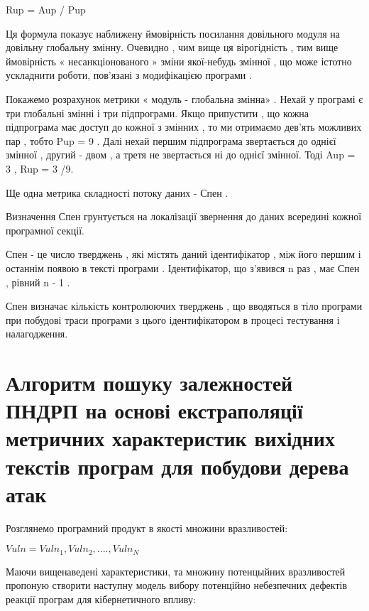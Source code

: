 Rup = Aup / Pup

Ця формула показує наближену ймовірність посилання довільного модуля на довільну глобальну змінну. Очевидно , чим вище ця вірогідність , тим вище ймовірність « несанкціонованого » зміни якої-небудь змінної , що може істотно ускладнити роботи, пов'язані з модифікацією програми .

Покажемо розрахунок метрики « модуль - глобальна змінна» . Нехай у програмі є три глобальні змінні і три підпрограми. Якщо припустити , що кожна підпрограма має доступ до кожної з змінних , то ми отримаємо дев'ять можливих пар , тобто Pup = 9 . Далі нехай першим підпрограма звертається до однієї змінної , другий - двом , а третя не звертається ні до однієї змінної. Тоді Aup = 3 , Rup = 3 /9.

Ще одна метрика складності потоку даних - Спен .

Визначення Спен грунтується на локалізації звернення до даних всередині кожної програмної секції.

Спен - це число тверджень , які містять даний ідентифікатор , між його першим і останнім появою в тексті програми . Ідентифікатор, що з'явився n раз , має Спен , рівний n - 1 .

Спен визначає кількість контролюючих тверджень , що вводяться в тіло програми при побудові траси програми з цього ідентифікатором в процесі тестування і налагодження.


\section{Алгоритм пошуку залежностей ПНДРП на основі екстраполяції метричних характеристик вихідних текстів програм для побудови дерева атак}
\label{2section:id13}
Розглянемо програмний продукт в якості множини вразливостей:

$Vuln = {Vuln_1,Vuln_2,....,Vuln_N}$

Маючи вищенаведені характеристики, та множину потенцыйних вразливостей пропоную створити наступну модель вибору потенційно небезпечних дефектів реакції програм для кібернетичного впливу:

